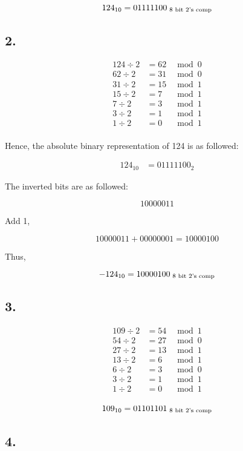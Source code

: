 \documentclass[10pt]{article}
\begin{document}
$$
124_{10}=01111100 \textsubscript{ 8 bit 2's comp}
$$

\subsection*{2.}

$$
\begin{aligned}
124 \div 2 & =62 & \bmod 0 \\
62 \div 2 & =31 & \bmod 0 \\
31 \div 2 & =15 & \bmod 1 \\
15 \div 2 & =7 & \bmod 1 \\
7 \div 2 & =3 & \bmod 1 \\
3 \div 2 & =1 & \bmod 1 \\
1 \div 2 & =0 & \bmod 1 \\
\end{aligned}
$$

Hence, the absolute binary representation of 124 is as followed:

$$
\begin{aligned}
124_{10} & =01111100_{2}
\end{aligned}
$$

The inverted bits are as followed:

$$
10000011
$$

Add 1,

$$
10000011+00000001=10000100
$$

Thus,

$$
-124_{10}=10000100 \textsubscript{ 8 bit 2's comp}
$$

\subsection*{3.}

$$
\begin{aligned}
109 \div 2 &= 54 & \bmod 1 \\
54 \div 2 &= 27 & \bmod 0 \\
27 \div 2 &= 13 & \bmod 1 \\
13 \div 2 &= 6 & \bmod 1 \\
6 \div 2 &= 3 & \bmod 0 \\
3 \div 2 &= 1 & \bmod 1 \\
1 \div 2 &= 0 & \bmod 1 \\
\end{aligned}
$$

$$
109_{10}=01101101 \textsubscript{ 8 bit 2's comp}
$$

\subsection*{4.}
\end{document}
